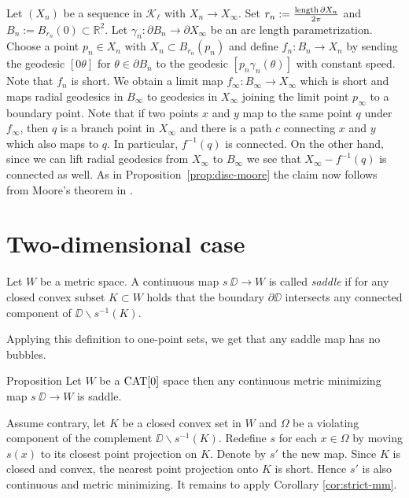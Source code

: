\documentclass[a4paper,10pt]{amsart}
\begin{document}
Let $(X_n)$ be a sequence in $\mathcal{K}_\ell$ with $X_n\to X_\infty$. Set $r_n:=\frac{\mathop{\rm length}\nolimits\partial X_n}{2\pi}$ and $B_n:=B_{r_n}(0)\subset \mathbb{R}^2$.
Let $\gamma_n:\partial B_n\to\partial X_\infty$ be an arc length parametrization. Choose a point $p_n\in X_n$ with $X_n\subset B_{r_n}(p_n)$ and define
$f_n:B_n\to X_n$ by sending the geodesic $[0\theta]$ for $\theta\in\partial B_n$ to the geodesic $[p_n\gamma_n(\theta)]$ with constant speed. Note that $f_n$ is short.
We obtain a limit map $f_\infty:B_\infty\to X_\infty$ which is short and maps radial geodesics in $B_\infty$ to geodesics in $X_\infty$ joining the limit point $p_\infty$
to a boundary point. Note that if two points $x$  and $y$ map to the same point $q$ under $f_\infty$, then $q$ is a branch point in $X_\infty$ and there is a path $c$ connecting 
$x$ and $y$ which also maps to $q$. In particular, $f^{-1}(q)$ is connected. On the other hand, since we can lift radial geodesics from $X_\infty$ to $B_\infty$ we see that $X_\infty-f^{-1}(q)$
is connected as well. As in Proposition~\ref{prop:disc-moore} the claim now follows from Moore's theorem in \cite{moore}.

\section{Two-dimensional case}

Let $W$ be a metric space.
A continuous map $s\:\DD\to W$ is called \emph{saddle} if for any closed convex subset $K\subset W$ holds that
the boundary $\partial \DD$ intersects
any connected component of $\DD\backslash s^{-1}(K)$.

Applying this definition to one-point sets,
we get that any saddle map has no bubbles.


\begin{thm}{Proposition}\label{prop:memisaddle}
Let $W$ be a $\mathop{\rm CAT}\nolimits[0]$ space then any continuous metric minimizing map $s\:\DD\to W$ is saddle.
\end{thm}

Assume contrary, let $K$ be a closed convex set in $W$
and $\Omega$ be a violating component of the complement $\DD\backslash s^{-1}(K)$. 
Redefine $s$ for each $x\in\Omega$ by moving 
$s(x)$ to its closest point projection on $K$.
Denote by $s'$ the new map. Since $K$ is closed and convex, the nearest point projection onto $K$ is short.
Hence $s'$ is also continuous and metric minimizing. It remains to apply Corollary \ref{cor:strict-mm}.
\qeds
\end{document}
